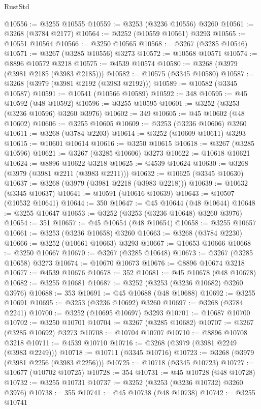 \begin{lexlean}{RustStd}
\begin{coremodule}
@10556 := @3255 @10555
@10559 := @3253 (@3236 @10556) @3260
@10561 := @3268 (@3784 @2177)
@10564 := @3252 (@10559 @10561) @3293
@10565 := @10551 @10564
@10566 := @3250 @10565
@10568 := @3267 (@3285 @10546)
@10571 := @3267 (@3285 @10556) @3273
@10572 := @10568 @10571
@10574 := @8896 @10572 @3218
@10575 := @4539 @10574
@10580 := @3268 (@3979 (@3981 @2185 (@3983 @2185)))
@10582 := @10575 (@3345 @10580)
@10587 := @3268 (@3979 (@3981 @2192 (@3983 @2192)))
@10589 := @10582 (@3345 @10587)
@10591 := @10541 (@10566 @10589)
@10592 := 348
@10595 := @45 @10592 (@48 @10592)
@10596 := @3255 @10595
@10601 := @3252 (@3253 (@3236 @10596) @3260 @3976)
@10602 := 349
@10605 := @45 @10602 (@48 @10602)
@10606 := @3255 @10605
@10609 := @3253 (@3236 @10606) @3260
@10611 := @3268 (@3784 @2203)
@10614 := @3252 (@10609 @10611) @3293
@10615 := @10601 @10614
@10616 := @3250 @10615
@10618 := @3267 (@3285 @10596)
@10621 := @3267 (@3285 @10606) @3273
@10622 := @10618 @10621
@10624 := @8896 @10622 @3218
@10625 := @4539 @10624
@10630 := @3268 (@3979 (@3981 @2211 (@3983 @2211)))
@10632 := @10625 (@3345 @10630)
@10637 := @3268 (@3979 (@3981 @2218 (@3983 @2218)))
@10639 := @10632 (@3345 @10637)
@10641 := @10591 (@10616 @10639)
@10643 := @10507 (@10532 @10641)
@10644 := 350
@10647 := @45 @10644 (@48 @10644)
@10648 := @3255 @10647
@10653 := @3252 (@3253 (@3236 @10648) @3260 @3976)
@10654 := 351
@10657 := @45 @10654 (@48 @10654)
@10658 := @3255 @10657
@10661 := @3253 (@3236 @10658) @3260
@10663 := @3268 (@3784 @2230)
@10666 := @3252 (@10661 @10663) @3293
@10667 := @10653 @10666
@10668 := @3250 @10667
@10670 := @3267 (@3285 @10648)
@10673 := @3267 (@3285 @10658) @3273
@10674 := @10670 @10673
@10676 := @8896 @10674 @3218
@10677 := @4539 @10676
@10678 := 352
@10681 := @45 @10678 (@48 @10678)
@10682 := @3255 @10681
@10687 := @3252 (@3253 (@3236 @10682) @3260 @3976)
@10688 := 353
@10691 := @45 @10688 (@48 @10688)
@10692 := @3255 @10691
@10695 := @3253 (@3236 @10692) @3260
@10697 := @3268 (@3784 @2241)
@10700 := @3252 (@10695 @10697) @3293
@10701 := @10687 @10700
@10702 := @3250 @10701
@10704 := @3267 (@3285 @10682)
@10707 := @3267 (@3285 @10692) @3273
@10708 := @10704 @10707
@10710 := @8896 @10708 @3218
@10711 := @4539 @10710
@10716 := @3268 (@3979 (@3981 @2249 (@3983 @2249)))
@10718 := @10711 (@3345 @10716)
@10723 := @3268 (@3979 (@3981 @2256 (@3983 @2256)))
@10725 := @10718 (@3345 @10723)
@10727 := @10677 (@10702 @10725)
@10728 := 354
@10731 := @45 @10728 (@48 @10728)
@10732 := @3255 @10731
@10737 := @3252 (@3253 (@3236 @10732) @3260 @3976)
@10738 := 355
@10741 := @45 @10738 (@48 @10738)
@10742 := @3255 @10741

\end{coremodule}
\end{lexlean}
